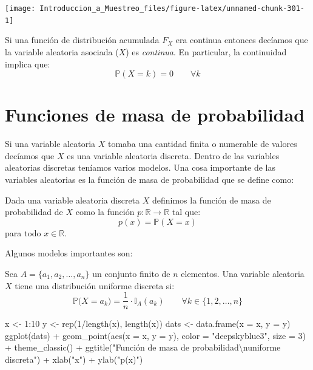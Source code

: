 \documentclass[
]{book}
\newenvironment{Shaded}{\begin{snugshade}}{\end{snugshade}}
\newcommand{\AttributeTok}[1]{\textcolor[rgb]{0.77,0.63,0.00}{#1}}
\newcommand{\DecValTok}[1]{\textcolor[rgb]{0.00,0.00,0.81}{#1}}
\newcommand{\FunctionTok}[1]{\textcolor[rgb]{0.00,0.00,0.00}{#1}}
\newcommand{\NormalTok}[1]{#1}
\newcommand{\OtherTok}[1]{\textcolor[rgb]{0.56,0.35,0.01}{#1}}
\newcommand{\SpecialCharTok}[1]{\textcolor[rgb]{0.00,0.00,0.00}{#1}}
\newcommand{\StringTok}[1]{\textcolor[rgb]{0.31,0.60,0.02}{#1}}
\begin{document}
\begin{center}\texttt{[image: Introduccion\_a\_Muestreo\_files/figure-latex/unnamed-chunk-301-1]} \end{center}

Si una función de distribución acumulada \(F_X\) era continua entonces decíamos que la variable aleatoria asociada (\(X\)) es \emph{continua}. En particular, la continuidad implica que:
\[
\mathbb{P}(X = k) = 0 \qquad \forall k 
\]

\hypertarget{funciones-de-masa-de-probabilidad}{%
\section{Funciones de masa de probabilidad}\label{funciones-de-masa-de-probabilidad}}

Si una variable aleatoria \(X\) tomaba una cantidad finita o numerable de valores decíamos que \(X\) es una variable aleatoria discreta. Dentro de las variables aleatorias discretas teníamos varios modelos. Una cosa importante de las variables aleatorias es la función de masa de probabilidad que se define como:

Dada una variable aleatoria discreta \(X\) definimos la función de masa de probabilidad de \(X\) como la función \(p:\mathbb{R} \to \mathbb{R}\) tal que:
\[
p(x) = \mathbb{P}(X = x)
\]
para todo \(x \in\mathbb{R}\).

Algunos modelos importantes son:

Sea \(A = \{ a_1, a_2, \dots, a_n \}\) un conjunto finito de \(n\) elementos. Una variable aleatoria \(X\) tiene una distribución uniforme discreta si:
\[
\mathbb{P}\big( X = a_k \big) = \dfrac{1}{n} \cdot \mathbb{I}_{A}(a_k) \qquad \forall k \in \{ 1, 2, \dots, n \} 
\]

\begin{Shaded}
\begin{Highlighting}[]
\NormalTok{x }\OtherTok{\textless{}{-}} \DecValTok{1}\SpecialCharTok{:}\DecValTok{10}
\NormalTok{y }\OtherTok{\textless{}{-}} \FunctionTok{rep}\NormalTok{(}\DecValTok{1}\SpecialCharTok{/}\FunctionTok{length}\NormalTok{(x), }\FunctionTok{length}\NormalTok{(x))}
\NormalTok{dats }\OtherTok{\textless{}{-}} \FunctionTok{data.frame}\NormalTok{(}\AttributeTok{x =}\NormalTok{ x, }\AttributeTok{y =}\NormalTok{ y)}
\FunctionTok{ggplot}\NormalTok{(dats) }\SpecialCharTok{+} \FunctionTok{geom\_point}\NormalTok{(}\FunctionTok{aes}\NormalTok{(}\AttributeTok{x =}\NormalTok{ x, }\AttributeTok{y =}\NormalTok{ y), }\AttributeTok{color =} \StringTok{"deepskyblue3"}\NormalTok{, }\AttributeTok{size =} \DecValTok{3}\NormalTok{) }\SpecialCharTok{+} \FunctionTok{theme\_classic}\NormalTok{() }\SpecialCharTok{+} \FunctionTok{ggtitle}\NormalTok{(}\StringTok{"Función de masa de probabilidad}\SpecialCharTok{\textbackslash{}n}\StringTok{uniforme discreta"}\NormalTok{) }\SpecialCharTok{+}
  \FunctionTok{xlab}\NormalTok{(}\StringTok{"x"}\NormalTok{) }\SpecialCharTok{+} \FunctionTok{ylab}\NormalTok{(}\StringTok{"p(x)"}\NormalTok{)}
\end{Highlighting}
\end{Shaded}
\end{document}
